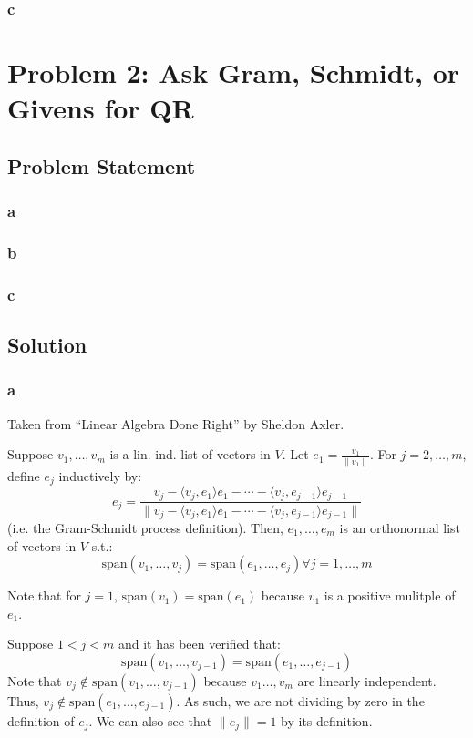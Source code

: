 \documentclass[11pt]{report}
\theoremstyle{definition}
\begin{document}
\subsubsection*{c}

\newpage

\section*{Problem 2: Ask Gram, Schmidt, or Givens for QR}
\subsection*{Problem Statement}
\subsubsection*{a}

\subsubsection*{b}

\subsubsection*{c}

\subsection*{Solution}
\subsubsection*{a}
Taken from ``Linear Algebra Done Right'' by Sheldon Axler.

Suppose $v_1,\ldots,v_m$ is a lin. ind. list of vectors in $V$. Let $e_1=\frac{v_1}{\|v_1\|}$. For
$j=2,\ldots,m$, define $e_j$ inductively by:
\[
	e_j = \frac{
	v_j-\langle v_j,e_1\rangle e_1-\cdots -\langle v_j,e_{j-1}\rangle e_{j-1}
	}{
	\|v_j-\langle v_j,e_1\rangle e_1-\cdots -\langle v_j,e_{j-1}\rangle e_{j-1}\|
	}
\]
(i.e. the Gram-Schmidt process definition). Then, $e_1,\ldots,e_m$ is an orthonormal list of vectors in $V$ s.t.:
\[\mathrm{span}(v_1,\ldots,v_j)=\mathrm{span}(e_1,\ldots,e_j)\forall j=1,\ldots,m\]


Note that for $j=1$, $\mathrm{span}(v_1)=\mathrm{span}(e_1)$ because $v_1$ is a positive mulitple of $e_1$.

Suppose $1<j<m$ and it has been verified that:
\[\mathrm{span}(v_1,\ldots,v_{j-1})=\mathrm{span}(e_1,\ldots,e_{j-1})\]
Note that $v_j\notin \mathrm{span}(v_1,\ldots,v_{j-1})$ because $v_1\ldots,v_m$ are linearly independent.
Thus, $v_j\notin \mathrm{span}(e_1,\ldots,e_{j-1})$. As such, we are not dividing by zero in the definition of $e_j$.
We can also see that $\|e_j\|=1$ by its definition.
\end{document}
